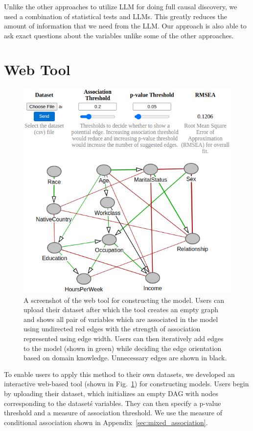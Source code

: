 \documentclass{uai2025} %
\begin{document}
Unlike the other approaches to utilize LLM for doing full causal discovery, we 
used a combination of statistical tests and LLMs. This greatly reduces the
amount of information that we need from the LLM. Our approach is also able to 
ask exact questions about the variables unlike some of the other approaches.

\section{Web Tool}
\label{sec:web}

\begin{figure}[t!]
	\centering
	\includegraphics[scale=0.4]{../code/plots/web_tool_full_new.png}
	\caption{A screenshot of the web tool for constructing the model. Users
		can upload their dataset after which the tool creates an empty
		graph and shows all pair of variables which are associated in
		the model using undirected red edges with the strength of
		association represented using edge width. Users can then
		iteratively add edges to the model (shown in green) while
		deciding the edge orientation based on domain knowledge.
		Unnecessary edges are shown in black.}
	\label{fig:web}
\end{figure}

To enable users to apply this method to their own datasets, we developed an
interactive web-based tool (shown in Fig.~\ref{fig:web}) for constructing
models. Users begin by uploading their dataset, which initializes an empty DAG
with nodes corresponding to the dataset\'s variables. They can then specify a
p-value threshold and a measure of association threshold. We use the measure of 
conditional association shown in Appendix~\ref{sec:mixed_association}. 
\end{document}
